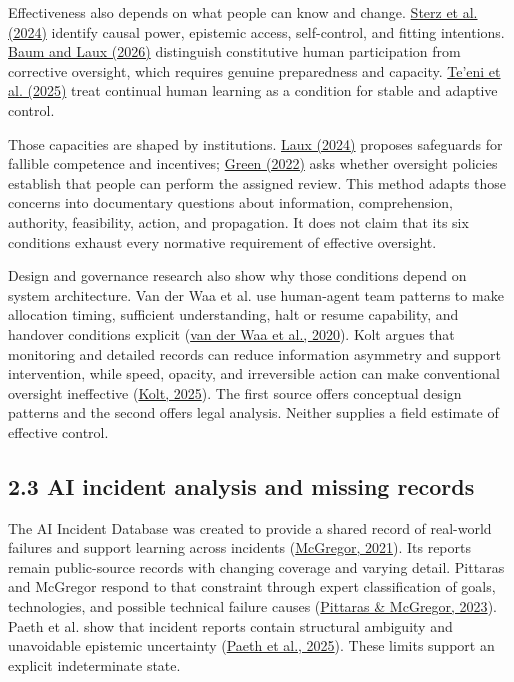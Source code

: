 \documentclass[11pt]{article}
\begin{document}
Effectiveness also depends on what people can know and change. \href{https://doi.org/10.1145/3630106.3659051}{Sterz et al. (2024)} identify causal power, epistemic access, self-control, and fitting intentions. \href{https://doi.org/10.48550/arXiv.2603.19213}{Baum and Laux (2026)} distinguish constitutive human participation from corrective oversight, which requires genuine preparedness and capacity. \href{https://doi.org/10.1007/s00146-025-02401-y}{Te'eni et al. (2025)} treat continual human learning as a condition for stable and adaptive control.

Those capacities are shaped by institutions. \href{https://doi.org/10.1007/s00146-023-01777-z}{Laux (2024)} proposes safeguards for fallible competence and incentives; \href{https://doi.org/10.1016/j.clsr.2022.105681}{Green (2022)} asks whether oversight policies establish that people can perform the assigned review. This method adapts those concerns into documentary questions about information, comprehension, authority, feasibility, action, and propagation. It does not claim that its six conditions exhaust every normative requirement of effective oversight.

Design and governance research also show why those conditions depend on system architecture. Van der Waa et al. use human-agent team patterns to make allocation timing, sufficient understanding, halt or resume capability, and handover conditions explicit (\href{https://doi.org/10.1007/978-3-030-49183-3_16}{van der Waa et al., 2020}). Kolt argues that monitoring and detailed records can reduce information asymmetry and support intervention, while speed, opacity, and irreversible action can make conventional oversight ineffective (\href{https://arxiv.org/abs/2501.07913}{Kolt, 2025}). The first source offers conceptual design patterns and the second offers legal analysis. Neither supplies a field estimate of effective control.

\subsection*{2.3 AI incident analysis and missing records}

The AI Incident Database was created to provide a shared record of real-world failures and support learning across incidents (\href{https://doi.org/10.1609/aaai.v35i17.17817}{McGregor, 2021}). Its reports remain public-source records with changing coverage and varying detail. Pittaras and McGregor respond to that constraint through expert classification of goals, technologies, and possible technical failure causes (\href{https://ceur-ws.org/Vol-3381/17.pdf}{Pittaras \& McGregor, 2023}). Paeth et al. show that incident reports contain structural ambiguity and unavoidable epistemic uncertainty (\href{https://doi.org/10.1609/aaai.v39i28.35163}{Paeth et al., 2025}). These limits support an explicit indeterminate state.
\end{document}
